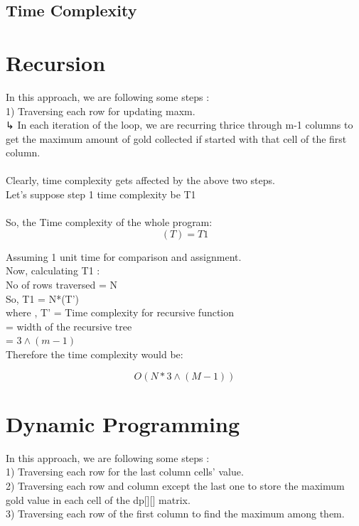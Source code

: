 \documentclass[conference]{IEEEtran}
\begin{document}
\subsection{Time Complexity}
\section*{Recursion}

In this approach, we are following some steps :\\
1)  Traversing each row for updating maxm.\\
       ↳  In each iteration of the loop, we are recurring thrice through m-1 columns to get the maximum amount of gold collected if started with that cell of the first column.\\\\

Clearly, time complexity gets affected by the above two steps.\\
Let's suppose step 1 time complexity be T1 \\\\
So, the Time complexity of the whole program:
      \[ (T) = T1 \]

Assuming 1 unit time for comparison and assignment.\\

 Now, calculating T1 :\\
No of rows traversed = N\\
So, T1 = N*(T’)\\
  where , T’ =  Time complexity for recursive function\\
                    = width of the recursive tree\\
	      = \( 3\wedge (m-1) \) \\
Therefore the time complexity would be:

\[O(N*3\wedge (M-1))\]
     

\bigskip



\section*{Dynamic Programming}


In this approach, we are following some steps :\\
1) Traversing each row for the last column cells’ value.\\
2) Traversing each row and column except the last one to store the maximum gold value in each cell of the dp[][] matrix.\\
3) Traversing each row of the first column to find the maximum among them.\\\\
\end{document}
